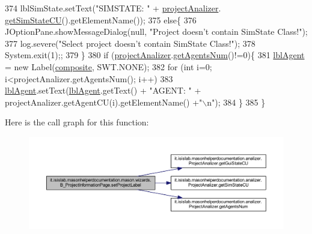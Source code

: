 \begin{DoxyCode}
374             lblSimState.setText(\textcolor{stringliteral}{"SIMSTATE: "} + \hyperlink{classit_1_1isislab_1_1masonhelperdocumentation_1_1mason_1_1wizards_1_1_b___project_information_page_aa0397b2de6a01a90d6d2eb52645f5173}{projectAnalizer}.
      \hyperlink{classit_1_1isislab_1_1masonhelperdocumentation_1_1analizer_1_1_project_analizer_ab45de2e388d612362f7c79004aa73788}{getSimStateCU}().getElementName());
375         \textcolor{keywordflow}{else}\{
376             JOptionPane.showMessageDialog(null, \textcolor{stringliteral}{"Project doesn't contain SimState Class!"});
377             log.severe(\textcolor{stringliteral}{"Select project doesn't contain SimState Class!"});
378             System.exit(1);;
379         \}           
380         \textcolor{keywordflow}{if} (\hyperlink{classit_1_1isislab_1_1masonhelperdocumentation_1_1mason_1_1wizards_1_1_b___project_information_page_aa0397b2de6a01a90d6d2eb52645f5173}{projectAnalizer}.\hyperlink{classit_1_1isislab_1_1masonhelperdocumentation_1_1analizer_1_1_project_analizer_a48a20f5da4980049099e61b2586ee568}{getAgentsNum}()!=0)\{
381             \hyperlink{classit_1_1isislab_1_1masonhelperdocumentation_1_1mason_1_1wizards_1_1_b___project_information_page_a13700876bf889b097f466ac7d3e7128c}{lblAgent} = \textcolor{keyword}{new} Label(\hyperlink{classit_1_1isislab_1_1masonhelperdocumentation_1_1mason_1_1wizards_1_1_b___project_information_page_a5463a1c435b5fdb6fc4ca2009d7ed215}{composite}, SWT.NONE);
382             \textcolor{keywordflow}{for} (\textcolor{keywordtype}{int} i=0; i<projectAnalizer.getAgentsNum(); i++)
383                 \hyperlink{classit_1_1isislab_1_1masonhelperdocumentation_1_1mason_1_1wizards_1_1_b___project_information_page_a13700876bf889b097f466ac7d3e7128c}{lblAgent}.setText(\hyperlink{classit_1_1isislab_1_1masonhelperdocumentation_1_1mason_1_1wizards_1_1_b___project_information_page_a13700876bf889b097f466ac7d3e7128c}{lblAgent}.getText() + \textcolor{stringliteral}{"AGENT: "} + 
      projectAnalizer.getAgentCU(i).getElementName() +\textcolor{stringliteral}{"\(\backslash\)n"});
384         \}
385     \}
\end{DoxyCode}


Here is the call graph for this function\-:
\nopagebreak
\begin{figure}[H]
\begin{center}
\leavevmode
\includegraphics[width=350pt]{classit_1_1isislab_1_1masonhelperdocumentation_1_1mason_1_1wizards_1_1_b___project_information_page_afa7497cd5a5b4b3c5fb7f7f1397ebb72_cgraph}
\end{center}
\end{figure}




